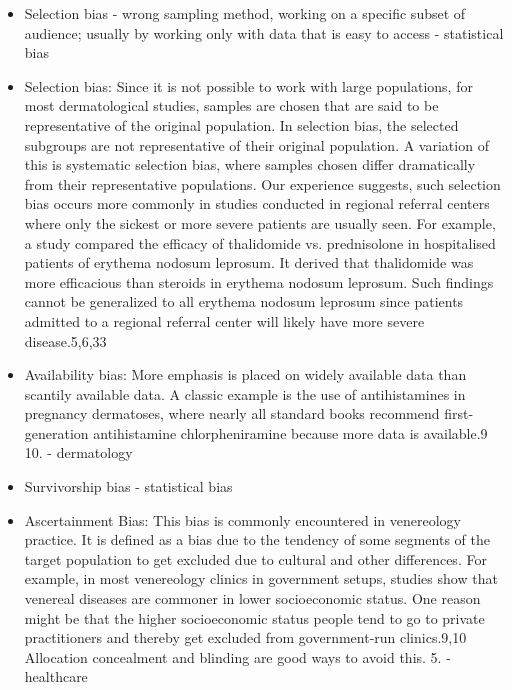 \begin{refsection}
\begin{itemize}
			\item Selection bias - wrong sampling method, working on a specific subset of audience; usually by working only with data that is easy to access \autocites{Mester_2022}{Mester_2017} - statistical bias
			\item Selection bias: Since it is not possible to work with large populations, for most dermatological studies, samples are chosen that are said to be representative of the original population. 
			In selection bias, the selected subgroups are not representative of their original population.
			A variation of this is systematic selection bias, where samples chosen differ dramatically from their representative populations.
			Our experience suggests, such selection bias occurs more commonly in studies conducted in regional referral centers where only the sickest or more severe patients are usually seen.
			For example, a study compared the efficacy of thalidomide vs. prednisolone in hospitalised patients of erythema nodosum leprosum. It derived that thalidomide was more efficacious than steroids in erythema nodosum leprosum. Such findings cannot be generalized to all erythema nodosum leprosum since patients admitted to a regional referral center will likely have more severe disease.5,6,33 \autocite{Chakraborty_2024}
			\item  Availability bias: More emphasis is placed on widely available data than scantily available data. A classic example is the use of antihistamines in pregnancy dermatoses, where nearly all standard books recommend first-generation antihistamine chlorpheniramine because more data is available.9 10. \autocite{Chakraborty_2024} - dermatology
			
			\item Survivorship bias \autocites{Mester_2022}{Mester_2017} - statistical bias
			
			
			\item Ascertainment Bias: This bias is commonly encountered in venereology practice. It is defined as a bias due to the tendency of some segments of the target population to get excluded due to cultural and other differences. For example, in most venereology clinics in government setups, studies show that venereal diseases are commoner in lower socioeconomic status. One reason might be that the higher socioeconomic status people tend to go to private practitioners and thereby get excluded from government-run clinics.9,10 Allocation concealment and blinding are good ways to avoid this. 5. \autocite{Chakraborty_2024} - healthcare
			\rawcitationusedend
		\end{itemize}
		

\end{refsection}

